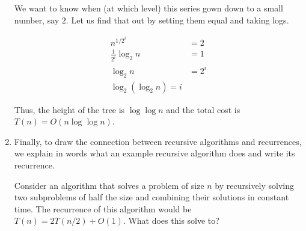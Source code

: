 \documentclass[12pt]{article}
\theoremstyle{definition}
\begin{document}
\begin{enumerate}[label = (\alph*)]
  We want to know when (at which level) this series gown down to a small number, say $2$.  Let us find that out by setting them equal and taking logs.  
  
  \begin{align*}
      n^{1/2^i} &= 2\\
      \frac{1}{2^i} \log_2 n &= 1\\
      \log_2 n &= 2^i\\
      \log_2 (\log_2 n) = i 
  \end{align*}
  
  Thus, the height of the tree is $\log\log n$ and the total cost is $T(n) = O(n \log \log n)$.
  
  \item Finally, to draw the connection between recursive algorithms and recurrences, we explain in words what an example recursive algorithm does and write its recurrence.
  
  Consider an algorithm that solves a problem of size $n$ by recursively solving two subproblems of half the size and combining their solutions in constant time.  The recurrence of this algorithm would be $T(n) = 2T(n/2) + O(1)$. What does this solve to?
  

\end{enumerate}
\end{document}
